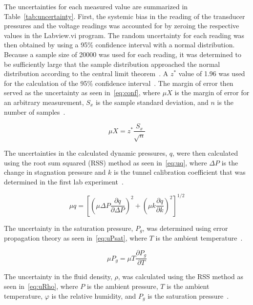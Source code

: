 \documentclass[journal,letterpaper]{IEEEtran}
\begin{document}
The uncertainties for each measured value are summarized in Table~\ref{tab:uncertainty}.
First, the systemic bias in the reading of the transducer pressures and the voltage readings was accounted for by zeroing the respective values in the Labview.vi program.
The random uncertainty for each reading was then obtained by using a 95\% confidence interval with a normal distribution.
Because a sample size of 20000 was used for each reading, it was determined to be sufficiently large that the sample distribution approached the normal distribution according to the central limit theorem~\cite{MoMLecture}.
A $z^*$ value of 1.96 was used for the calculation of the 95\% confidence interval~\cite{MoMLecture}.
The margin of error then served as the uncertainty as seen in~\eqref{eq:conf}, where $\mu X$ is the margin of error for an arbitrary measurement, $S_x$ is the sample standard deviation, and $n$ is the number of samples~\cite{MoMLecture}.

\begin{equation} \label{eq:conf}
    \mu X = z^* \frac{S_x}{\sqrt{n}}
\end{equation}

The uncertainties in the calculated dynamic pressures, $q$, were then calculated using the root sum squared (RSS) method as seen in~\eqref{eq:uq}, where $\Delta P$ is the change in stagnation pressure and $k$ is the tunnel calibration coefficient that was determined in the first lab experiment~\cite{MoMLecture}.

\begin{equation} \label{eq:uq}
    \mu q = \left[\left(\mu \Delta P \frac{\partial q}{\partial \Delta P}\right)^2 + \left(\mu k \frac{\partial q}{\partial k}\right)^2\right]^{1/2}
\end{equation}

The uncertainty in the saturation pressure, $P_g$, was determined using error propagation theory as seen in~\eqref{eq:uPsat}, where $T$ is the ambient temperature~\cite{errorprop}.

\begin{equation} \label{eq:uPsat}
    \mu P_g = \mu T \frac{\partial P_g}{\partial T}
\end{equation}

The uncertainty in the fluid density, $\rho$, was calculated using the RSS method as seen in~\eqref{eq:uRho}, where $P$ is the ambient pressure, $T$ is the ambient temperature, $\varphi$ is the relative humidity, and $P_g$ is the saturation pressure~\cite{MoMLecture}.
\end{document}
